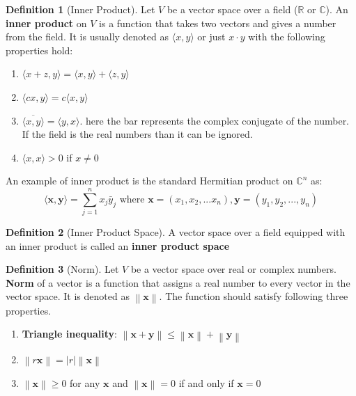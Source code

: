 \documentclass[11pt,a4paper]{article}
\theoremstyle{definition}
\newtheorem{definition}{Definition}[section]
\begin{document}
	\begin{definition}[Inner Product]
		Let $V$ be a vector space over a field ($\mathbb{R}$ or $\mathbb{C}$). An \textbf{inner product} on $V$ is a function that takes two vectors and gives a number from the field. It is usually denoted as $\langle x,y \rangle$ or just $ x \cdot y$ with the following properties hold:
		\begin{enumerate}[label=(\alph*)]
			\item $\langle x + z, y \rangle = \langle x, y \rangle + \langle z,y \rangle $
			\item $\langle cx,y \rangle = c \langle x,y \rangle$
			\item $\overline{\langle x,y \rangle} = \langle y,x \rangle$. here the bar represents the complex conjugate of the number. If the field is the real numbers than it can be ignored.
			\item $ \langle x,x \rangle > 0$ if $x \neq 0$
		\end{enumerate}
 	\end{definition}
	An example of inner product is the standard Hermitian product on $\mathbb{C}^n$ as: $$ \langle \bm{x,y} \rangle = \sum_{j=1}^{n}x_j\bar y_j \text{ where } \bm{x} = (x_1, x_2, ... x_n), \bm{y}= (y_1, y_2, ... , y_n)$$
	
	\begin{definition}[Inner Product Space]
		A vector space over a field equipped with an inner product is called an \textbf{inner product space}
	\end{definition}
	
	\begin{definition}[Norm] Let $V$ be a vector space over real or complex numbers.  \textbf{Norm} of a vector is a function that assigns a real number to every vector in the vector space. It is denoted as $ \left\| \bm{x} \right\|$. The function should satisfy following three properties.
		\begin{enumerate}
			\item \textbf{Triangle inequality}: $ \left\| \bm{x+y}\right\| \leq \left\|\bm{x}\right\| + \left\| \bm{y}\right\|$
			\item $\left\| r\bm{x}\right\| = |r|\left\| \bm{x}\right\|$
			\item $ \left\|\bm{x}\right\| \geq 0 $ for any $\bm{x}$ and  $ \left\|\bm{x}\right\| = 0 $ if and only if $ \bm{x} = 0$
		\end{enumerate}
	\end{definition}
	
\end{document}
